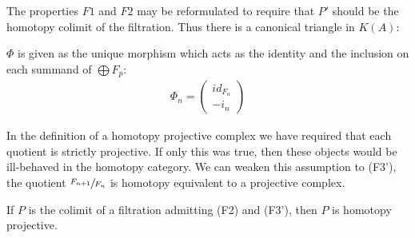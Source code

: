 \documentclass[../thesis.tex]{subfiles}
\begin{document}
            \begin{remark}
                The properties $F1$ and $F2$ may be reformulated to require that $P'$ should be the homotopy colimit of the filtration. Thus there is a canonical triangle in $K(A)$:
                \begin{center}
                \end{center}
                $\Phi$ is given as the unique morphism which acts as the identity and the inclusion on each summand of $\bigoplus F_p$:
                \begin{align*}
                    \Phi_n = \begin{pmatrix}
                        id_{F_n} \\ -i_n
                    \end{pmatrix}
                \end{align*}
            \end{remark}

            In the definition of a homotopy projective complex we have required that each quotient is strictly projective. If only this was true, then these objects would be ill-behaved in the homotopy category. We can weaken this assumption to (F3'), the quotient $\sfrac{F_{n+1}}{F_n}$ is homotopy equivalent to a projective complex.

            \begin{lemma}\label{lem: homo-proj-homo-well-def}
                If $P$ is the colimit of a filtration admitting (F2) and (F3'), then $P$ is homotopy projective.
            \end{lemma}
\end{document}

